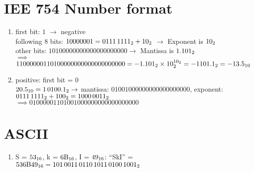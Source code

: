 \documentclass[sectionformat = exercise]{gadsescript}
\begin{document}
\maketitle
\section{IEE 754 Number format}
\begin{enumerate}[label=\alph*)]
	\item first bit: $ 1 $ $ \rightarrow $ negative\\
		following $ 8 $ bits: $ 10000001 = \binnum[8]{0111 1111} + \binnum{10} $ $ \rightarrow $ Exponent is $ \binnum{10} $\\
		other bits: $ {101 0000 0000 0000 0000 0000} \rightarrow $ Mantissa is $ \binnum{1.101} $\\
		$\implies$ $1 1000 0001 10100000000000000000000 = - \binnum{1.101} \times \binnum{10}^{\binnum{10}} = -\binnum{1101.1} = -\decnum{13.5} $
	\item positive: first bit = 0\\
		$\decnum{20.5} =  \binnum{10100.1} \rightarrow $ mantissa: $ 01001000000000000000000 $, exponent: $\binnum[8]{111 1111} + \binnum{100} = \binnum[8]{1000 0011} $\\
		$\implies 0 1000 0011 010 0100 0000 0000 0000 0000$
\end{enumerate}

\section{ASCII}
\begin{enumerate}[label=\alph*)]
	\item S = $ \text{53}_{16} $, k = $ \text{6B}_{16} $, I = $ \text{49}_{16} $: ``SkI'' = $ \hexnum{536B49} = \binnum{0101 0011 0110 1011 0100 1001} $
\end{enumerate}

\newpage
\end{document}
